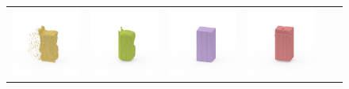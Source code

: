 \documentclass[10pt,twocolumn,letterpaper]{article}
\begin{document}
\begin{figure}
\begin{tabular}{cccccc}
\includegraphics[height=\turnheight, clip=true, trim=60 30 30 60]{data/renders_turn_table/zilla_night_black_heat_NP2_312.mat_visible_pixels_view_180} &
\includegraphics[height=\turnheight, clip=true, trim=60 30 30 60]{data/renders_turn_table/zilla_night_black_heat_NP2_312.mat_gt_view_180} &
\includegraphics[height=\turnheight, clip=true, trim=60 30 30 60]{data/renders_turn_table/zilla_night_black_heat_NP2_312.mat_bb_view_180} &
\includegraphics[height=\turnheight, clip=true, trim=60 30 30 60]{data/renders_turn_table/zilla_night_black_heat_NP2_312.mat_zheng_view_180} &

\end{tabular}
\end{figure}
\end{document}
